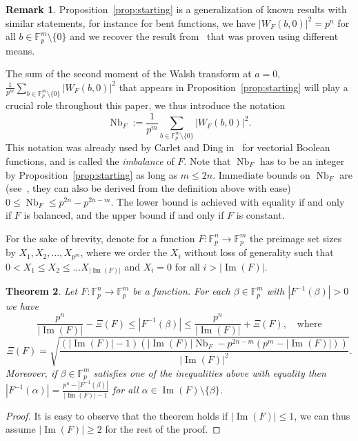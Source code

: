 \documentclass[11pt]{article}
\newcommand{\F}{\mathbb F}
\DeclareMathOperator{\Nb}{Nb}
\theoremstyle{plain}
\newtheorem{theorem}{Theorem}[section]
\theoremstyle{definition}
\newtheorem{remark}[theorem]{Remark}
\numberwithin{theorem}{section}
\numberwithin{equation}{section}
\numberwithin{table}{section}
\numberwithin{figure}{section}
\DeclareMathOperator{\image}{Im}
\begin{document}
{\begin{remark}
    Proposition~\ref{prop:starting} is a generalization of known results with similar statements, for instance for bent functions, we have $|W_F(b,0)|^2=p^n$ for all $b \in \F_p^m\setminus\{0\}$ and we recover the result from~\cite[Proposition 2.1.]{KoelschPolujan2024} that was proven using different means.
\end{remark}

The sum of the second moment of the Walsh transform  {at $a=0$},  $\frac{1}{p^m}\sum_{b \in \F_p^m\setminus\{0\}} |W_F(b,0)|^2$ that appears in Proposition~\ref{prop:starting} will play a crucial role throughout this paper, we thus introduce the notation
\[\Nb_F:=\frac{1}{p^m}\sum_{b \in \F_p^m\setminus\{0\}} |W_F(b,0)|^2.\]
This notation was already used by Carlet and Ding in~\cite{carlet2007nonlinearities} for vectorial Boolean functions, and is called the \emph{imbalance} of $F$.
Note that $\Nb_F$ has to be an integer by Proposition~\ref{prop:starting} as long as $m \leq 2n$. Immediate bounds on $\Nb_F$ are (see~\cite[Proposition 1]{carlet2007nonlinearities}, they can also be derived from the definition above with ease) $0 \leq \Nb_F \leq p^{2n}-p^{2n-m}$. The lower bound is achieved with equality if and only if $F$ is balanced, and the upper bound if and only if $F$ is constant.

For the sake of brevity, denote for a function $F \colon \F_p^n \rightarrow \F_p^m$ the preimage set sizes by $X_1,X_2,\dots,X_{p^m}$, where we order the $X_i$ without loss of generality such that $0<X_1\leq X_2 \leq \dots X_{|\image(F)|}$ and $X_i=0$ for all $i>|\image(F)|$.

\begin{theorem} \label{th:cs_general}
    Let $F \colon \F_{p}^n \rightarrow \F_{p}^m$ be a function. For each $\beta \in \F_p^m$ with $|F^{-1}(\beta)|>0$ we have
    \begin{equation}\label{eq: bounds}
        \frac{p^n}{|\image(F)|}-\Xi(F)\le |F^{-1}(\beta)| \le \frac{p^n}{|\image(F)|}+\Xi(F),\quad \mbox{where}
    \end{equation}
    \begin{equation}\label{eq: defect}
       \Xi(F)=\sqrt{\frac{(|\image(F)|-1)  \left( |\image(F)| \Nb_F -p^{2 n-m} \left(p^m-|\image(F)|\right)\right)}{|\image(F)|^2}}.
    \end{equation}
    Moreover, if $\beta \in \F_p^m$ satisfies one of the inequalities above with equality then $|F^{-1}(\alpha)|=\frac{p^n-|F^{-1}(\beta)|}{|\image(F)|-1}$ for all $\alpha \in \image(F)\setminus \{\beta\}$.
\end{theorem}
\begin{proof}
   It is easy to observe that the theorem holds if $|\image(F)|\leq 1$, we can thus assume $|\image(F)|\geq 2$ for the rest of the proof.
   

\end{proof}}
\end{document}
